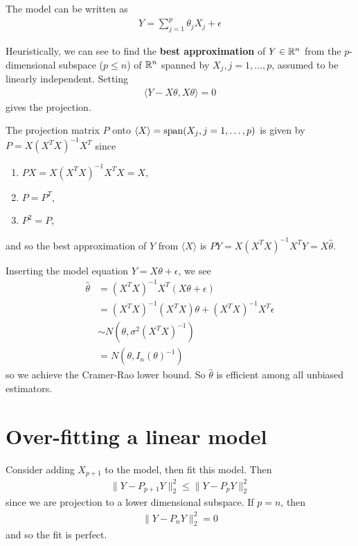 \begin{proposition}
  The model can be written as
  \begin{align}
    \label{eq:100}
    Y = \sum_{j=1}^{p} \theta_{j} X_{j} + \epsilon
  \end{align}

  Heuristically, we can see to find the \textbf{best approximation} of
  $Y \in \mathbb{R}^{n}$ from the $p$-dimensional subspace ($p \leq n$) of
  $\mathbb{R}^{n}$ spanned by $X_{j}, j = 1, \dots, p$, assumed to be linearly
  independent.  Setting
  \begin{align}
    \label{eq:100}
    \langle Y - X \theta, X\theta \rangle = 0
  \end{align} gives the projection.

  The projection matrix $P$ onto $\langle X \rangle = \operatorname*{span} (X_{j}, j
  = 1, \dots, p)$ is given by $P = X (X^{T} X)^{-1} X^{T}$ since
  \begin{enumerate}
  \item $PX = X (X^{T} X)^{-1} X^{T} X = X$,
  \item $P = P^{T}$,
  \item $P^{2} = P$,
  \end{enumerate} and so the best approximation of $Y$ from $\langle X
  \rangle$ is $PY = X (X^{T} X)^{-1} X^{T} Y = X \hat \theta$.

  Inserting the model equation $Y = X \theta + \epsilon$, we see
  \begin{align}
    \label{eq:100}
    \hat \theta &= (X^{T} X)^{-1} X^{T} (X \theta + \epsilon) \\
    &= (X^{T} X)^{-1} (X^{T} X) \theta + (X^{T} X)^{-1} X^{T} \epsilon  \\
    &\sim N(\theta, \sigma^{2} (X^{T} X)^{-1}) \\
    &= N(\theta, I_{n}(\theta)^{-1})
  \end{align} so we achieve the Cramer-Rao lower bound.  So $\hat
  \theta$ is efficient among all unbiased estimators.
\end{proposition}

\section{Over-fitting a linear model}
\label{sec:overf-line-model}

Consider adding $X_{p+1}$ to the model, then fit this model.  Then
\begin{align}
  \label{eq:100}
  \| Y - P_{p+1}Y \|_{2}^{2} \leq \| Y - P_{p} Y \|_{2}^{2}
\end{align} since we are projection to a lower dimensional subspace.
If $p = n$, then
\begin{align}
  \label{eq:100}
  \|Y - P_{n} Y \|_{2}^{2} = 0
\end{align} and so the fit is perfect.

